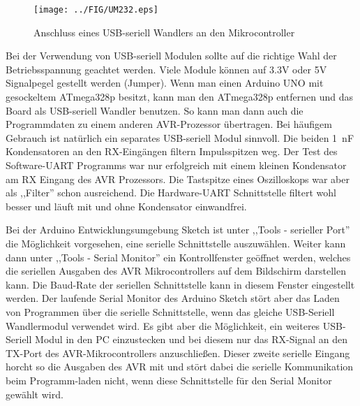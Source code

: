 \begin{figure}[H]
\centering
\texttt{[image: ../FIG/UM232.eps]}
\caption{Anschluss eines USB-seriell Wandlers an den Mikrocontroller}
\label{fig:UM232}
\end{figure}

Bei der Verwendung von USB-seriell Modulen sollte auf die richtige Wahl der Betriebsspannung
geachtet werden. Viele Module können auf 3.3V oder 5V Signalpegel gestellt werden (Jumper).
Wenn man einen Arduino UNO mit gesockeltem ATmega328p besitzt, kann man den ATmega328p 
entfernen und das Board als USB-seriell Wandler benutzen. 
So kann man dann auch die Programmdaten zu einem anderen AVR-Prozessor übertragen.
Bei häufigem Gebrauch ist natürlich ein separates USB-seriell Modul sinnvoll.
Die beiden 1~nF Kondensatoren an den RX-Eingängen filtern Impulsspitzen weg. Der Test
des Software-UART Programms war nur erfolgreich mit einem kleinen Kondensator am RX Eingang
des AVR Prozessors. Die Tastspitze eines Oszilloskops war aber als ,,Filter'' schon ausreichend.
Die Hardware-UART Schnittstelle filtert wohl besser und läuft mit und ohne Kondensator einwandfrei.

Bei der Arduino Entwicklungsumgebung Sketch ist unter ,,Tools - serieller Port'' die Möglichkeit vorgesehen,
eine serielle Schnittstelle auszuwählen. Weiter kann dann unter ,,Tools - Serial Monitor'' ein Kontrollfenster
geöffnet werden, welches die seriellen Ausgaben des AVR Mikrocontrollers auf dem Bildschirm darstellen
kann. Die Baud-Rate der seriellen Schnittstelle kann in diesem Fenster eingestellt werden.
Der laufende Serial Monitor des Arduino Sketch stört aber das Laden von Programmen über die serielle
Schnittstelle, wenn das gleiche USB-Seriell Wandlermodul verwendet wird.
Es gibt aber die Möglichkeit, ein weiteres USB-Seriell Modul in den PC einzustecken und bei diesem
nur das RX-Signal an den TX-Port des AVR-Mikrocontrollers anzuschließen.
Dieser zweite serielle Eingang horcht so die Ausgaben des AVR mit und stört dabei die serielle 
Kommunikation beim Programm-laden nicht, wenn diese Schnittstelle für den Serial Monitor gewählt wird.

